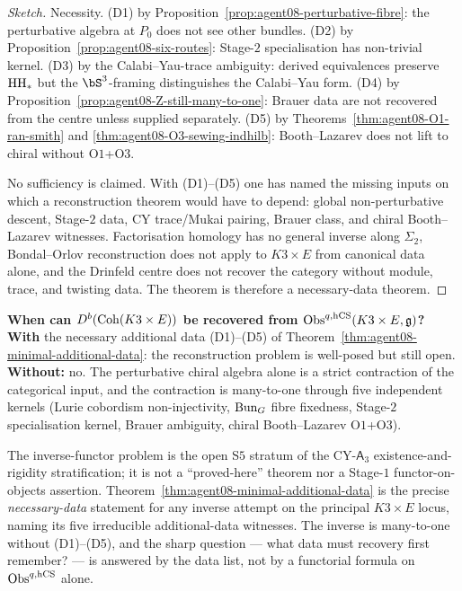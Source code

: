 \begin{proof}[Sketch]
Necessity. (D1) by Proposition~\ref{prop:agent08-perturbative-fibre}: the
perturbative algebra at $P_0$ does not see other bundles. (D2) by
Proposition~\ref{prop:agent08-six-routes}: Stage-$2$ specialisation has
non-trivial kernel. (D3) by the Calabi--Yau-trace ambiguity: derived
equivalences preserve $\mathrm{HH}_*$ but the $\bS^3$-framing distinguishes
the Calabi--Yau form. (D4) by
Proposition~\ref{prop:agent08-Z-still-many-to-one}: Brauer data are not
recovered from the centre unless supplied separately. (D5) by
Theorems~\ref{thm:agent08-O1-ran-smith} and
\ref{thm:agent08-O3-sewing-indhilb}: Booth--Lazarev does not lift to
chiral without O$1$+O$3$.

No sufficiency is claimed. With (D1)--(D5) one has named the missing
inputs on which a reconstruction theorem would have to depend: global
non-perturbative descent, Stage-$2$ data, CY trace/Mukai pairing,
Brauer class, and chiral Booth--Lazarev witnesses. Factorisation
homology has no general inverse along $\Sigma_2$, Bondal--Orlov
reconstruction does not apply to $K3\times E$ from canonical data
alone, and the Drinfeld centre does not recover the category without
module, trace, and twisting data. The theorem is therefore a
necessary-data theorem.
\end{proof}

\begin{remark}
\label{rem:agent08-sharp-answer}
\textbf{When can $D^b(\mathrm{Coh}(K3\times E))$ be recovered from
$\mathrm{Obs}^{q,\mathrm{hCS}}(K3\times E,\mathfrak{g})$?}
\textbf{With} the necessary additional data \textup{(D1)--(D5)} of
Theorem~\ref{thm:agent08-minimal-additional-data}: the reconstruction
problem is well-posed but still open.
\textbf{Without:} no. The perturbative chiral algebra alone is a strict
contraction of the categorical input, and the contraction is many-to-one
through five independent kernels (Lurie cobordism non-injectivity,
$\mathrm{Bun}_G$ fibre fixedness, Stage-$2$ specialisation kernel, Brauer
ambiguity, chiral Booth--Lazarev O$1$+O$3$).
\end{remark}

\begin{remark}
\label{rem:agent08-cya3-position}
The inverse-functor problem is the open S$5$ stratum of the
CY-$\mathsf A_3$ existence-and-rigidity stratification; it is not a
``proved-here'' theorem nor a Stage-$1$ functor-on-objects assertion.
Theorem~\ref{thm:agent08-minimal-additional-data} is the precise
\emph{necessary-data} statement for any inverse attempt on the principal
$K3\times E$ locus, naming its five irreducible additional-data
witnesses. The inverse is many-to-one without (D1)--(D5), and the
sharp question --- what data must recovery first remember? --- is
answered by the data list, not by a functorial formula on
$\mathrm{Obs}^{q,\mathrm{hCS}}$ alone.
\end{remark}

